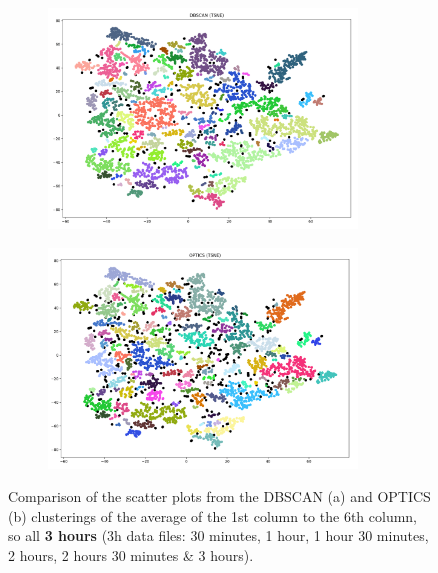 \begin{figure}[H]
	\centering
	\begin{subfigure}{.5\textwidth}
    \centering
    \includegraphics[width=0.9\textwidth]{./images/clusteringResults/3h-6-DBSCAN.png}
  \end{subfigure}%
  \begin{subfigure}{.5\textwidth}
    \centering
    \includegraphics[width=0.9\textwidth]{./images/clusteringResults/3h-6-OPTICS.png}
	\end{subfigure}
	\caption{Comparison of the scatter plots from the DBSCAN (a) and OPTICS (b) clusterings of the average of the 1st column to the 6th column, so all \textbf{3 hours} (3h data files: 30 minutes, 1 hour, 1 hour 30 minutes, 2 hours, 2 hours 30 minutes \& 3 hours).}
  \label{figure:finalClustering3h-6}
\end{figure}


\clearpage

